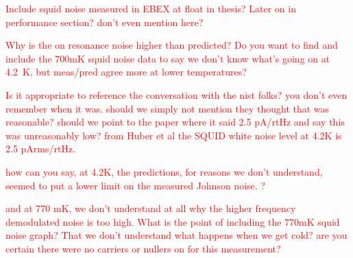 

\textcolor{red}{Include squid noise measured in EBEX at float in thesis? Later on in performance section? don't even mention here?}

\textcolor{red}{Why is the on resonance noise higher than predicted? Do you want to find and include the 700mK squid noise data to say we don't know what's going on at 4.2~K, but meas/pred agree more at lower temperatures?}

\textcolor{red}{Is it appropriate to reference the conversation with the nist folks? you don't even remember when it was. should we simply not mention they thought that was reasonable? should we point to the paper where it said 2.5 pA/rtHz and say this was unreasonably low? from Huber et al the SQUID white noise level at 4.2K is 2.5 pArms/rtHz.}

\textcolor{red}{how can you say, at 4.2K, the predictions, for reasons we don't understand, seemed to put a lower limit on the measured Johnson noise. ?}

\textcolor{red}{and at 770 mK, we don't understand at all why the higher frequency demodulated noise is too high. What is the point of including the 770mK squid noise graph? That we don't understand what happens when we get cold? are you certain there were no carriers or nullers on for this measurement?}

